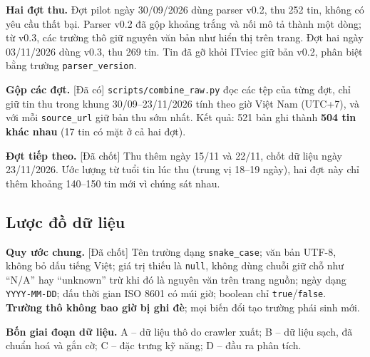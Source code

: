\documentclass[12pt]{article}
\newcommand{\code}[1]{\texttt{#1}}
\newcommand{\dacoi}{\textsf{[Đã có]}}
\newcommand{\dachot}{\textsf{[Đã chốt]}}
\begin{document}
\textbf{Hai đợt thu.} Đợt pilot ngày 30/09/2026 dùng parser v0.2, thu 252 tin, không có yêu cầu thất bại. Parser v0.2 đã gộp khoảng trắng và nối mô tả thành một dòng; từ v0.3, các trường thô giữ nguyên văn bản như hiển thị trên trang. Đợt hai ngày 03/11/2026 dùng v0.3, thu 269 tin. Tin đã gỡ khỏi ITviec giữ bản v0.2, phân biệt bằng trường \code{parser\_version}.

\textbf{Gộp các đợt.} \dacoi{} \code{scripts/combine\_raw.py} đọc các tệp của từng đợt, chỉ giữ tin thu trong khung 30/09--23/11/2026 tính theo giờ Việt Nam (UTC+7), và với mỗi \code{source\_url} giữ bản thu sớm nhất. Kết quả: 521 bản ghi thành \textbf{504 tin khác nhau} (17 tin có mặt ở cả hai đợt).

\textbf{Đợt tiếp theo.} \dachot{} Thu thêm ngày 15/11 và 22/11, chốt dữ liệu ngày 23/11/2026. Ước lượng từ tuổi tin lúc thu (trung vị 18--19 ngày), hai đợt này chỉ thêm khoảng 140--150 tin mới vì chúng sát nhau.

\subsection{Lược đồ dữ liệu}
\label{sec:schema}

\textbf{Quy ước chung.} \dachot{} Tên trường dạng \code{snake\_case}; văn bản UTF-8, không bỏ dấu tiếng Việt; giá trị thiếu là \code{null}, không dùng chuỗi giữ chỗ như ``N/A'' hay ``unknown'' trừ khi đó là nguyên văn trên trang nguồn; ngày dạng \code{YYYY-MM-DD}; dấu thời gian ISO 8601 có múi giờ; boolean chỉ \code{true}/\code{false}. \textbf{Trường thô không bao giờ bị ghi đè}; mọi biến đổi tạo trường phái sinh mới.

\textbf{Bốn giai đoạn dữ liệu.} A -- dữ liệu thô do crawler xuất; B -- dữ liệu sạch, đã chuẩn hoá và gắn cờ; C -- đặc trưng kỹ năng; D -- đầu ra phân tích.
\end{document}
